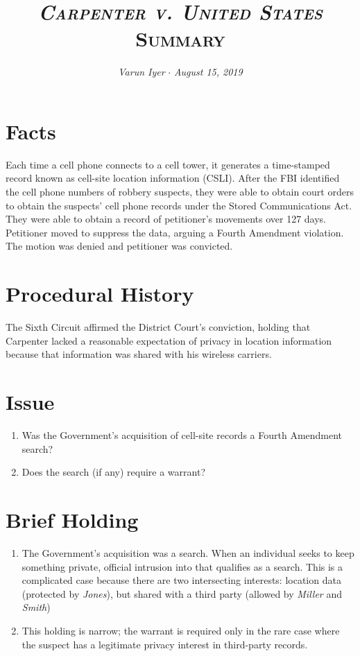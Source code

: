 \documentclass[paper=letter,fontsize=10pt]{article}
\title{\textsc{\textit{Carpenter v. United States} Summary}}
\date{}
\author{\textit{Varun Iyer} \hspace{.5em} $\cdot$ \hspace{.5em} \textit{August 15, 2019}}
\begin{document}
\maketitle
\section{Facts}
	Each time a cell phone connects to a cell tower, it generates a time-stamped record known as cell-site location information (CSLI).
	After the FBI identified the cell phone numbers of robbery suspects, they were able to obtain court orders to obtain the suspects’ cell phone records under the Stored Communications Act.
	They were able to obtain a record of petitioner’s movements over 127 days.
	Petitioner moved to suppress the data, arguing a Fourth Amendment violation.
	The motion was denied and petitioner was convicted.
\section{Procedural History}
	The Sixth Circuit affirmed the District Court’s conviction, holding that Carpenter lacked a reasonable expectation of privacy in location information because that information was shared with his wireless carriers.
\section{Issue}
	\begin{enumerate}
		\item Was the Government’s acquisition of cell-site records a Fourth Amendment search?
		\item Does the search (if any) require a warrant?
	\end{enumerate}
\section{Brief Holding}
	\begin{enumerate}
		\item The Government’s acquisition was a search. When an individual seeks to keep something private, official intrusion into that qualifies as a search.
		This is a complicated case because there are two intersecting interests: location data (protected by \textit{Jones}), but shared with a third party (allowed by \textit{Miller} and \textit{Smith})
		\item This holding is narrow; the warrant is required only in the rare case where the suspect has a legitimate privacy interest in third-party records.
	\end{enumerate}
\end{document}

